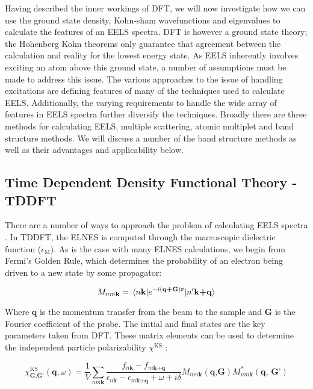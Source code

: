 
Having described the inner workings of DFT, we will now investigate how we can use the ground state density, Kohn-sham wavefunctions and eigenvalues to calculate the features of an EELS spectra.  DFT is however a ground state theory; the Hohenberg Kohn theorems only guarantee that agreement between the calculation and reality for the lowest energy state. As EELS inherently involves exciting an atom above this ground state, a number of assumptions must be made to address this issue. The various approaches to the issue of handling excitations are defining features of many of the techniques used to calculate EELS.  Additionally, the varying requirements to handle the wide array of features in EELS spectra further diversify the techniques. Broadly there are three methods for calculating EELS, multiple scattering, atomic multiplet and band structure methods.  We will discuss a number of the band structure methods as well as their advantages and applicability below.


\subsection{Time Dependent Density Functional Theory -TDDFT}
There are a number of ways to approach the problem of calculating EELS spectra \cite {optic, adler_quantum_1962}. In TDDFT, the ELNES is computed through the macroscopic dielectric function ($\epsilon_{\mathrm{M}}$). As is the case with many ELNES calculations, we begin from Fermi's Golden Rule, which determines the probability of an electron being driven to a new state by some propagator:

\begin{equation}
M_{nm\textbf{k}} = \mel{n\textbf{k}}{e^{-i(\textbf{q+G})\textbf{r}}}{n'\textbf{k+q}}
\label{FGR}
\end{equation}

Where $\textbf{q}$ is the momentum transfer from the beam to the sample and \textbf{G} is the Fourier coefficient of the probe. The initial and final states are the key parameters taken from DFT.  These matrix elements can be used to determine the independent particle polarizability $\chi^{\mathrm{KS}}$ \cite{exciting}: 


\begin{equation}
\chi^{\mathrm{KS}}_{\mathrm{\textbf{G,G'}}}(\textbf{q},\omega)=\frac{1}{V}\sum_{nm\textbf{k}}\frac{f_{n\textbf{k}}-f_{m\textbf{k+q}}}{\epsilon_{n\textbf{k}}-\epsilon_{m\textbf{k+q}}+\omega + i\delta} M_{nm\textbf{k}}(\textbf{q,G})M^*_{nm\textbf{k}}(\textbf{q, G'})
\end{equation}

